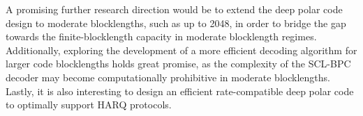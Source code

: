\documentclass[conference]{IEEEtran}
\begin{document}
A promising further research direction would be to extend the deep polar code design to moderate blocklengths, such as up to 2048, in order to bridge the gap towards the finite-blocklength capacity in moderate blocklength regimes. Additionally, exploring the development of a more efficient decoding algorithm for larger code blocklengths holds great promise, as the complexity of the SCL-BPC decoder may become computationally prohibitive in moderate blocklengths. Lastly, it is also interesting to design an efficient rate-compatible deep polar code to optimally support HARQ protocols. 





 
\end{document}
